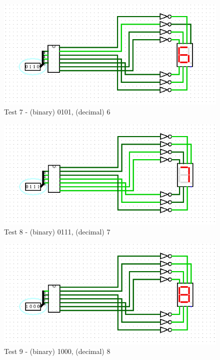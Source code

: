 \begin{figure}[h]
    \centering
    \includegraphics[width=\linewidth]{ScreenshotsTests/Comp 1/Comp 1_00003.png}
    \caption{Test 7 - (binary) 0101, (decimal) 6}
    \label{fig:test6}
\end{figure}

\begin{figure}[h]
    \centering
    \includegraphics[width=\linewidth]{ScreenshotsTests/Comp 1/Comp 1_00002.png}
    \caption{Test 8 - (binary) 0111, (decimal) 7}
    \label{fig:test7}
\end{figure}

\begin{figure}[h]
    \centering
    \includegraphics[width=\linewidth]{ScreenshotsTests/Comp 1/Comp 1_00001.png}
    \caption{Test 9 - (binary) 1000, (decimal) 8}
    \label{fig:test8}
\end{figure}

